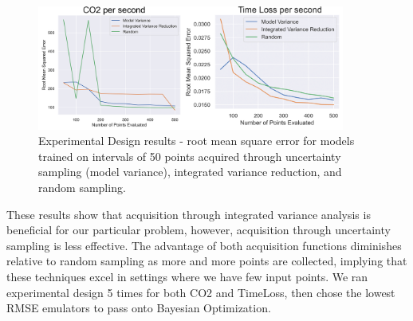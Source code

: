 \begin{figure}[b!]
    \centering
    \includegraphics[width=0.9\textwidth]{images/exp_design_graph.png}
    \caption{Experimental Design results - root mean square error for models trained on intervals of 50 points acquired through uncertainty sampling (model variance), integrated variance reduction, and random sampling.}
    \label{fig:exp-design-loss}
\end{figure}

These results show that acquisition through integrated variance analysis is beneficial for our particular problem, however, acquisition through uncertainty sampling is less effective. The advantage of both acquisition functions diminishes relative to random sampling as more and more points are collected, implying that these techniques excel in settings where we have few input points. We ran experimental design 5 times for both CO2 and TimeLoss, then chose the lowest RMSE emulators to pass onto Bayesian Optimization. 
